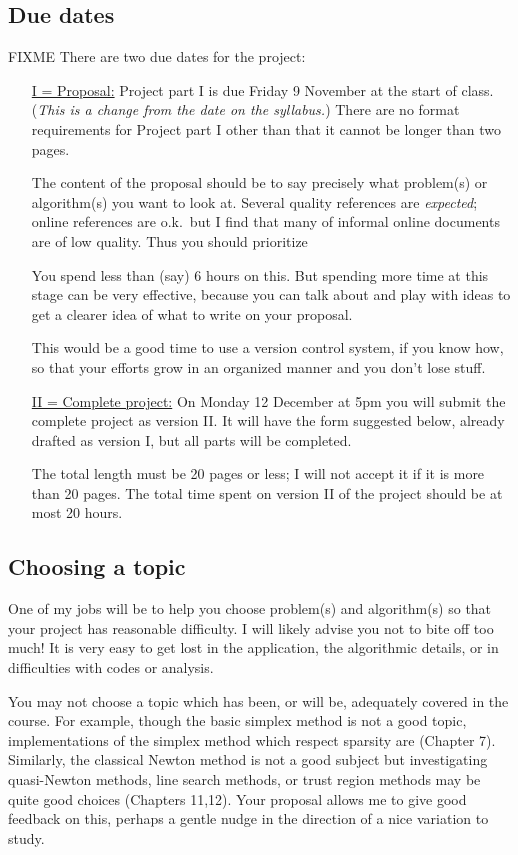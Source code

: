 \documentclass[12pt]{amsart}
\begin{document}
\subsection*{Due dates}  FIXME There are two due dates for the project:

\medskip
\begin{itemize}
\item[\underline{I = Proposal:}]  Project part I is due Friday 9 November at the start of class.  (\emph{This is a change from the date on the syllabus.})  There are no format requirements for Project part I other than that it cannot be longer than two pages.

The content of the proposal should be to say precisely what problem(s) or algorithm(s) you want to look at.  Several quality references are \emph{expected}; online references are o.k.~but I find that many of informal online documents are of low quality.  Thus you should prioritize 

You spend less than (say) 6 hours on this.  But spending more time at this stage can be very effective, because you can talk about and play with ideas to get a clearer idea of what to write on your proposal.

This would be a good time to use a version control system, if you know how, so that your efforts grow in an organized manner and you don't lose stuff.

\medskip
\item[\underline{II = Complete project:}]  On Monday 12 December at 5pm you will submit the complete project as version II.  It will have the form suggested below, already drafted as version I, but all parts will be completed.

The total length must be 20 pages or less; I will not accept it if it is more than 20 pages.  The total time spent on version II of the project should be at most 20 hours.
\end{itemize}


\subsection*{Choosing a topic}  One of my jobs will be to help you choose problem(s) and algorithm(s) so that your project has reasonable difficulty.  I will likely advise you not to bite off too much!  It is very easy to get lost in the application, the algorithmic details, or in difficulties with codes or analysis.

You may not choose a topic which has been, or will be, adequately covered in the course.  For example, though the basic simplex method is not a good topic, implementations of the simplex method which respect sparsity are (Chapter 7).  Similarly, the classical Newton method is not a good subject but investigating quasi-Newton methods, line search methods, or trust region methods may be quite good choices (Chapters 11,12).  Your proposal allows me to give good feedback on this, perhaps a gentle nudge in the direction of a nice variation to study.
\end{document}
